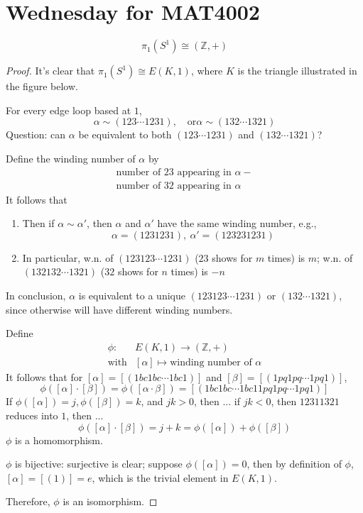 \section{Wednesday for MAT4002}
\begin{theorem}
\[
\pi_1(S^1)\cong(\mathbb{Z},+)
\]
\end{theorem}
\begin{proof}
It's clear that $\pi_1(S^1)\cong E(K,1)$, where $K$ is the triangle illustrated in the figure below.

For every edge loop based at $1$,
\[
\alpha\sim(123\cdots1231),\quad
\text{or}
\alpha\sim(132\cdots1321)
\]
Question: can $\alpha$ be equivalent to both $(123\cdots1231)$ and $(132\cdots1321)$?

Define the winding number of $\alpha$ by
\[
\begin{array}{l}
\text{number of 23 appearing in $\alpha$}-\\
\text{number of 32 appearing in $\alpha$}
\end{array}
\]
It follows that
\begin{enumerate}
\item
Then if $\alpha\sim\alpha'$, then $\alpha$ and $\alpha'$ have the same winding number, e.g.,
\[
\alpha = (1231231),\ \alpha'=(123231231)
\]
\item
In particular, w.n. of $(123123\cdots1231)$ ($23$ shows for $m$ times) is $m$;
w.n. of $(132132\cdots1321)$ ($32$ shows for $n$ times) is $-n$
\end{enumerate}
In conclusion, $\alpha$ is equivalent to a unique $(123123\cdots1231)$ or $(132\cdots1321)$, since otherwise will have different winding numbers.

Define
\[
\begin{array}{ll}\phi:
&E(K,1)\to (\mathbb{Z},+)\\\text{with}&[\alpha]\mapsto
\text{winding number of $\alpha$}
\end{array}
\]
It follows that for $[\alpha]=[(1bc1bc\cdots1bc1)]$ and $[\beta]=[(1pq1pq\cdots1pq1)]$,
\[
\phi([\alpha]\cdot[\beta])=\phi([\alpha\cdot\beta])
=
[(1bc1bc\cdots1bc11pq1pq\cdots1pq1)]
\]
If $\phi([\alpha])=j,\phi([\beta])=k$, and $jk>0$, then ...
if $jk<0$, then $12311321$ reduces into $1$, then ...
\[
\phi([\alpha]\cdot[\beta])=j+k=\phi([\alpha])+\phi([\beta])
\]
$\phi$ is a homomorphism.

$\phi$ is bijective: surjective is clear; suppose $\phi([\alpha])=0$, then by definition of $\phi$, $[\alpha]=[(1)]=e$, which is the trivial element in $E(K,1)$.

Therefore, $\phi$ is an isomorphism.
\end{proof}

